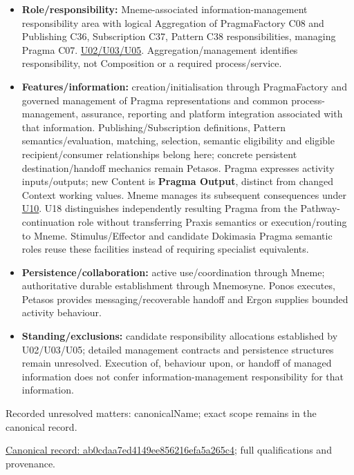 \begin{itemize}


\item \textbf{Role/responsibility:} Mneme-associated information-management responsibility
  area with logical Aggregation of PragmaFactory C08 and Publishing C36,
  Subscription C37, Pattern C38 responsibilities, managing Pragma C07.
  \href{\detokenize{../../../../../docs/markdown/05-information-systems-architecture/sources.md#u05}}{U02/U03/U05}. Aggregation/management identifies responsibility,
  not Composition or a required process/service.

\item \textbf{Features/information:} creation/initialisation through PragmaFactory and
  governed management of Pragma representations and common process-management,
  assurance, reporting and platform integration associated with that information.
  Publishing/Subscription definitions, Pattern semantics/evaluation, matching,
  selection, semantic eligibility and eligible recipient/consumer relationships
  belong here; concrete persistent destination/handoff mechanics remain Petasos.
  Pragma expresses activity inputs/outputs; new Content is \textbf{Pragma Output}, distinct
  from changed Context working values. Mneme manages its subsequent consequences
  under \hyperref[element:27ad143e7c784e378556af8a57c438f7]{U10}.
  U18 distinguishes independently resulting Pragma from the Pathway-continuation
  role without transferring Praxis semantics or execution/routing to Mneme.
  Stimulus/Effector and candidate Dokimasia Pragma semantic roles
  reuse these facilities instead of requiring specialist equivalents.

\item \textbf{Persistence/collaboration:} active use/coordination through Mneme; authoritative
  durable establishment through Mnemosyne. Ponos executes, Petasos provides
  messaging/recoverable handoff and Ergon supplies bounded activity behaviour.

\item \textbf{Standing/exclusions:} candidate responsibility allocations established by
  U02/U03/U05;
  detailed management contracts and persistence structures remain unresolved.
  Execution of, behaviour upon, or handoff of managed information does not
  confer information-management responsibility for that information.

\end{itemize}

{\small Recorded unresolved matters: canonicalName; exact scope remains in the canonical record.}\par
{\footnotesize \href{../../../../continuum/application/application-function/ab0cdaa7ed4149ee856216efa5a265c4.md}{Canonical record: ab0cdaa7ed4149ee856216efa5a265c4}; full qualifications and provenance.}\par
